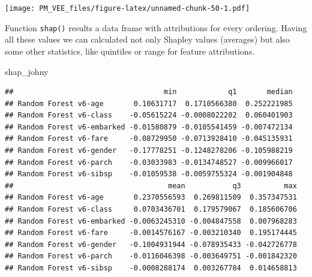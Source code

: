 \documentclass[12pt,]{krantz}
\newenvironment{Shaded}{\begin{snugshade}}{\end{snugshade}}
\newcommand{\DataTypeTok}[1]{\textcolor[rgb]{0.13,0.29,0.53}{#1}}
\newcommand{\FloatTok}[1]{\textcolor[rgb]{0.00,0.00,0.81}{#1}}
\newcommand{\KeywordTok}[1]{\textcolor[rgb]{0.13,0.29,0.53}{\textbf{#1}}}
\newcommand{\NormalTok}[1]{#1}
\newcommand{\OperatorTok}[1]{\textcolor[rgb]{0.81,0.36,0.00}{\textbf{#1}}}
\newcommand{\StringTok}[1]{\textcolor[rgb]{0.31,0.60,0.02}{#1}}
\theoremstyle{definition}
\theoremstyle{definition}
\theoremstyle{definition}
\theoremstyle{remark}
\begin{document}
\texttt{[image: PM\_VEE\_files/figure-latex/unnamed-chunk-50-1.pdf]}

Function \texttt{shap()} results a data frame with attributions for
every ordering. Having all these values we can calculated not only
Shapley values (averages) but also some other statistics, like quintiles
or range for feature attributions.

\begin{Shaded}
\begin{Highlighting}[]
\NormalTok{shap_johny}
\end{Highlighting}
\end{Shaded}

\begin{verbatim}
##                                   min            q1       median
## Random Forest v6-age       0.10631717  0.1710566380  0.252221985
## Random Forest v6-class    -0.05615224 -0.0008022202  0.060401903
## Random Forest v6-embarked -0.01580879 -0.0105541459 -0.007472134
## Random Forest v6-fare     -0.08729950 -0.0713928410 -0.045135931
## Random Forest v6-gender   -0.17778251 -0.1248278206 -0.105988219
## Random Forest v6-parch    -0.03033983 -0.0134748527 -0.009966017
## Random Forest v6-sibsp    -0.01059538 -0.0059755324 -0.001904848
##                                    mean           q3          max
## Random Forest v6-age       0.2370556593  0.269811509  0.357347531
## Random Forest v6-class     0.0703436701  0.179579067  0.185606706
## Random Forest v6-embarked -0.0063245310 -0.004847558  0.007968283
## Random Forest v6-fare     -0.0014576167 -0.003210340  0.195174445
## Random Forest v6-gender   -0.1004931944 -0.078935433 -0.042726778
## Random Forest v6-parch    -0.0116046398 -0.003649751 -0.001842320
## Random Forest v6-sibsp    -0.0008288174  0.003267784  0.014658813
\end{verbatim}

\begin{Shaded}
\end{Shaded}
\end{document}
